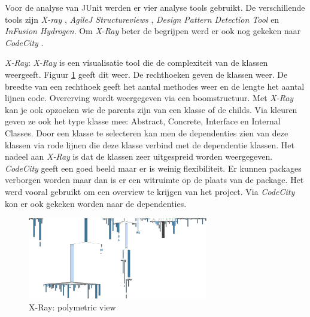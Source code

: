\documentclass[i1]{oss}
\begin{document}
Voor de analyse van JUnit werden er vier analyse tools gebruikt. De verschillende tools zijn \emph{X-ray} \cite{X-Ray}, \emph{AgileJ Structureviews} \cite{AgileJ Structureviews} , \emph{Design Pattern Detection Tool} \cite{Design Pattern Detection Tool} en \emph{InFusion Hydrogen}. Om \emph{X-Ray} beter de begrijpen werd er ook nog gekeken naar \emph{CodeCity} \cite{CodeCity}.

\begin{description}


\item \emph{X-Ray}: \emph{X-Ray} is een visualisatie tool die de complexiteit van de klassen weergeeft. Figuur \ref{fig:X-Ray} geeft dit weer. De rechthoeken geven de klassen weer. De breedte van een rechthoek geeft het aantal methodes weer en de lengte het aantal lijnen code. Overerving wordt weergegeven via een boomstructuur. Met \emph{X-Ray }kan je ook opzoeken wie de parents zijn van een klasse of de childs. Via kleuren geven ze ook het type klasse mee: Abstract, Concrete, Interface en Internal Classes. Door een klasse te selecteren kan men de dependenties zien van deze klassen via rode lijnen die deze klasse verbind met de dependentie klassen. Het nadeel aan \emph{X-Ray} is dat de klassen zeer uitgespreid worden weergegeven. \\
\emph{CodeCity} geeft een goed beeld maar er is weinig flexibiliteit. Er kunnen packages verborgen worden maar dan is er een witruimte op de plaats van de package. Het werd vooral gebruikt om een overview te krijgen van het project. Via \emph{CodeCity} kon er ook gekeken worden naar de dependenties. 


\begin{figure}[hb!]
	\centering
	\includegraphics[width=0.70\textwidth]{XRayComplexity}
	\caption{X-Ray: polymetric view}
	\label{fig:X-Ray}
\end{figure}


\end{description}
\end{document}
